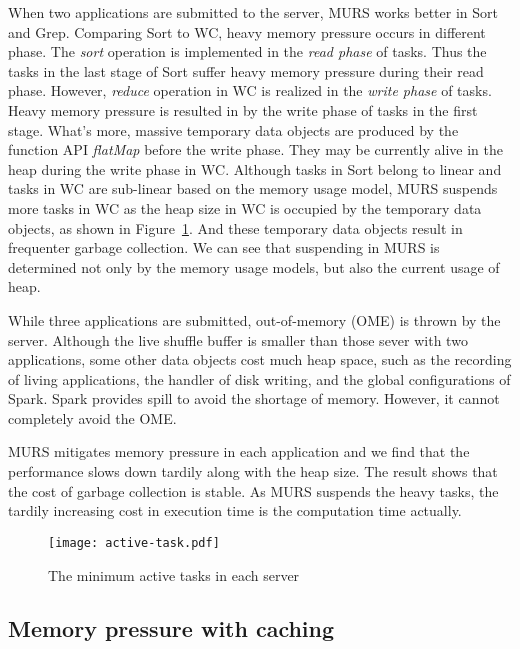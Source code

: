 When two applications are submitted to the server, MURS works better in Sort and Grep. Comparing Sort to WC, heavy memory pressure occurs in different phase. The \textit{sort} operation is implemented in the \textit{read phase} of tasks. Thus the tasks in the last stage of Sort suffer heavy memory pressure during their read phase. However, \textit{reduce} operation in WC is realized in the \textit{write phase} of tasks. Heavy memory pressure is resulted in by the write phase of tasks in the first stage. What's more, massive temporary data objects are produced by the function API \textit{flatMap} before the write phase. They may be currently alive in the heap during the write phase in WC. Although tasks in Sort belong to linear and tasks in WC are sub-linear based on the memory usage model, MURS suspends more tasks in WC as the heap size in WC is occupied by the temporary data objects, as shown in Figure~\ref{fig:active-task}. And these temporary data objects result in frequenter garbage collection. We can see that suspending in MURS is determined not only by the memory usage models, but also the current usage of heap. 

While three applications are submitted, out-of-memory (OME) is thrown by the server. Although the live shuffle buffer is smaller than those sever with two applications, some other data objects cost much heap space, such as the recording of living applications, the handler of disk writing, and the global configurations of Spark. Spark provides spill to avoid the shortage of memory. However, it cannot completely avoid the OME.

MURS mitigates memory pressure in each application and we find that the performance slows down tardily along with the heap size. The result shows that the cost of garbage collection is stable. As MURS suspends the heavy tasks, the tardily increasing cost in execution time is the computation time actually.  

\begin{figure}[!t]
\centering
\texttt{[image: active-task.pdf]}
\caption{The minimum active tasks in each server}
\label{fig:active-task}
\end{figure}

\subsection{Memory pressure with caching}


